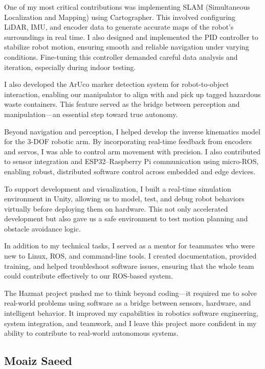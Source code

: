 \documentclass{article}
\begin{document}
\begin{appendices}
One of my most critical contributions was implementing SLAM (Simultaneous Localization and Mapping) using Cartographer. This involved configuring LiDAR, IMU, and encoder data to generate accurate maps of the robot's surroundings in real time. I also designed and implemented the PID controller to stabilize robot motion, ensuring smooth and reliable navigation under varying conditions. Fine-tuning this controller demanded careful data analysis and iteration, especially during indoor testing.

I also developed the ArUco marker detection system for robot-to-object interaction, enabling our manipulator to align with and pick up tagged hazardous waste containers. This feature served as the bridge between perception and manipulation---an essential step toward true autonomy.

Beyond navigation and perception, I helped develop the inverse kinematics model for the 3-DOF robotic arm. By incorporating real-time feedback from encoders and servos, I was able to control arm movement with precision. I also contributed to sensor integration and ESP32--Raspberry Pi communication using micro-ROS, enabling robust, distributed software control across embedded and edge devices.

To support development and visualization, I built a real-time simulation environment in Unity, allowing us to model, test, and debug robot behaviors virtually before deploying them on hardware. This not only accelerated development but also gave us a safe environment to test motion planning and obstacle avoidance logic.

In addition to my technical tasks, I served as a mentor for teammates who were new to Linux, ROS, and command-line tools. I created documentation, provided training, and helped troubleshoot software issues, ensuring that the whole team could contribute effectively to our ROS-based system.

The Hazmat project pushed me to think beyond coding---it required me to solve real-world problems using software as a bridge between sensors, hardware, and intelligent behavior. It improved my capabilities in robotics software engineering, system integration, and teamwork, and I leave this project more confident in my ability to contribute to real-world autonomous systems.

\subsection*{Moaiz Saeed}


\end{appendices}
\end{document}
